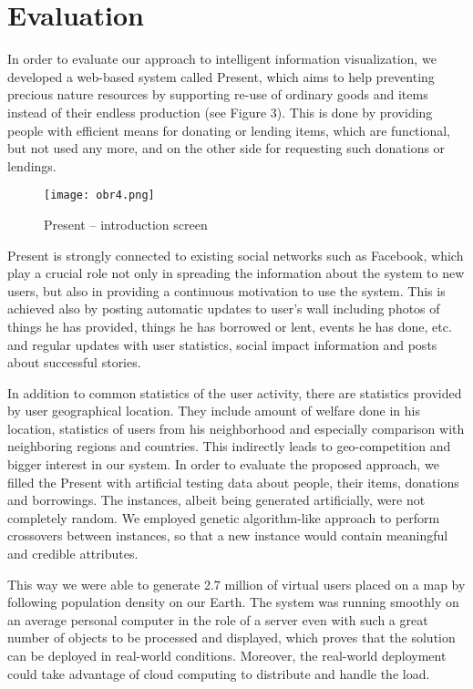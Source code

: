 \documentclass{llncs}
\begin{document}
\section{Evaluation}
In order to evaluate our approach to intelligent information visualization, we developed a web-based system called Present, which aims to help preventing precious nature resources by supporting re-use of ordinary goods and items instead of their endless production (see Figure 3). This is done by providing people with efficient means for donating or lending items, which are functional, but not used any more, and on the other side for requesting such donations or lendings.
\begin{figure}[h]
\centering
\texttt{[image: obr4.png]}
\caption{Present – introduction screen}
\end{figure}
Present is strongly connected to existing social networks such as Facebook, which play a crucial role not only in spreading the information about the system to new users, but also in providing a continuous motivation to use the system. This is achieved also by posting automatic updates to user's wall including photos of things he has provided, things he has borrowed or lent, events he has done, etc. and regular updates with user statistics, social impact information and posts about successful stories.

In addition to common statistics of the user activity, there are statistics provided by user geographical location. They include amount of welfare done in his location, statistics of users from his neighborhood and especially comparison with neighboring regions and countries. This indirectly leads to geo-competition and bigger interest in our system.
In order to evaluate the proposed approach, we filled the Present with artificial testing data about people, their items, donations and borrowings. The instances, albeit being generated artificially, were not completely random. We employed genetic algorithm-like approach to perform crossovers between instances, so that a new instance would contain meaningful and credible attributes.

This way we were able to generate 2.7 million of virtual users placed on a map by following population density on our Earth. The system was running smoothly on an average personal computer in the role of a server even with such a great number of objects to be processed and displayed, which proves that the solution can be deployed in real-world conditions. Moreover, the real-world deployment could take advantage of cloud computing to distribute and handle the load.
\end{document}
